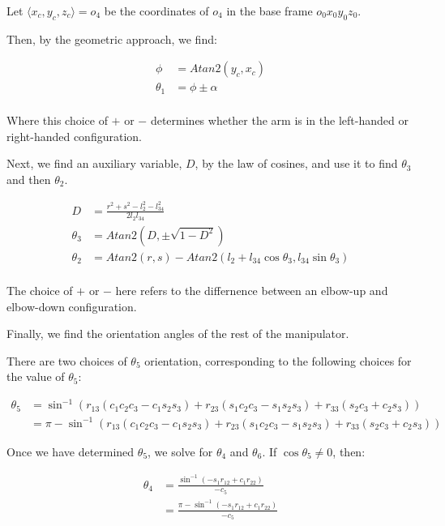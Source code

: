 \documentclass{article}
\begin{document}
Let $ \langle x_c, y_c, z_c \rangle  = o_4$ be the coordinates of $o_4$
	in the base frame $o_0 x_0 y_0 z_0$.

Then, by the geometric approach, we find:

\begin{align*}
\phi & = Atan2(y_c, x_c) \\
\theta_1 & = \phi \pm \alpha\\
\end{align*}

Where this choice of $+$ or $-$ determines whether the arm is in the left-handed
	or right-handed configuration.

Next, we find an auxiliary variable, $D$, by the law of cosines,
	and use it to find $\theta_3$ and then $\theta_2$.

\begin{align*}
D & = \frac{r^2 + s^2 - l_2^2 - l_{34}^2}{2 l_2 l_{34}} \\
\theta_3 & = Atan2(D, \pm \sqrt{1 - D^2}) \\
\theta_2 & = Atan2(r, s) - Atan2(l_2 + l_{34} \cos \theta_3, l_{34} \sin \theta_3) \\
\end{align*}

The choice of $+$ or $-$ here refers to the differnence between an elbow-up
	and elbow-down configuration.

Finally, we find the orientation angles of the rest of the manipulator.

There are two choices of $\theta_5$ orientation, corresponding to the following 
	choices for the value of $\theta_5$:

\begin{align*}
\theta_5 & = \sin^{-1} \left(
		r_{13} ( c_1 c_2 c_3 - c_1 s_2 s_3 ) + r_{23} (s_1 c_2 c_3 - s_1 s_2 s_3)
			+ r_{33} ( s_2 c_3 + c_2 s_3 ) \right) \\
& = \pi - \sin^{-1} \left(
		r_{13} ( c_1 c_2 c_3 - c_1 s_2 s_3 ) + r_{23} (s_1 c_2 c_3 - s_1 s_2 s_3)
			+ r_{33} ( s_2 c_3 + c_2 s_3 ) \right) 
\end{align*}

Once we have determined $\theta_5$, we solve for $\theta_4$ and $\theta_6$.
If $\cos \theta_5 \neq 0$, then:

\begin{align*}
\theta_4 & = \frac{\sin^{-1} \left( -s_1 r_{12} + c_1 r_{22} \right) }{- c_5}\\
& = \frac{\pi - \sin^{-1} \left( -s_1 r_{12} + c_1 r_{22} \right) }{- c_5}
\end{align*}
\end{document}
